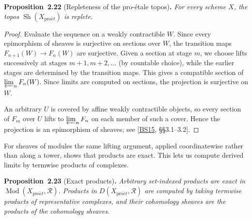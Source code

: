 \documentclass[11pt]{article}
\newenvironment{bpstatement}[2]{\par\addvspace{0.6\baselineskip}\noindent\textbf{#1}#2\textbf{.}\enspace\ignorespaces}
  {\par\addvspace{0.4\baselineskip}}
\newenvironment{bpstatementit}[2]{\begin{bpstatement}{#1}{#2}\itshape\ignorespaces}{\end{bpstatement}}
\providecommand{\Sh}{}\renewcommand{\Sh}{\operatorname{Sh}}
\begin{document}
\label{bp63}%
\begin{bpstatementit}{Proposition~2.22}{ (Repleteness of the pro-étale topos)}
For every scheme \(X\), the topos \(\Sh(X_{\mathrm{pro}\acute{e}t})\) is replete.
\end{bpstatementit}

\begin{proof}[{Proof}]\label{bp64}%
Evaluate the sequence on a weakly contractible \(W\). Since every epimorphism of sheaves is surjective on sections over \(W\), the transition maps \(F_{n+1}(W)\to F_n(W)\) are surjective. Given a section at stage \(m\), we choose lifts successively at stages \(m+1,m+2,\ldots\) (by countable choice), while the earlier stages are determined by the transition maps. This gives a compatible section of \(\varprojlim_nF_n(W)\). Since limits are computed on sections, the projection is surjective on \(W\).

An arbitrary \(U\) is covered by affine weakly contractible objects, so every section of \(F_m\) over \(U\) lifts to \(\varprojlim_nF_n\) on each member of such a cover. Hence the projection is an epimorphism of sheaves; see [\hyperref[bp191]{BS15}, §§3.1–3.2].
\end{proof}

\label{bp65}%
For sheaves of modules the same lifting argument, applied coordinatewise rather than along a tower, shows that products are exact. This lets us compute derived limits by termwise products of complexes.

\label{bp66}%
\begin{bpstatementit}{Proposition~2.23}{ (Exact products)}
Arbitrary set-indexed products are exact in \(\operatorname{Mod}(X_{\mathrm{pro}\acute{e}t},\mathcal R)\). Products in \(D(X_{\mathrm{pro}\acute{e}t},\mathcal R)\) are computed by taking termwise products of representative complexes, and their cohomology sheaves are the products of the cohomology sheaves.
\end{bpstatementit}
\end{document}
